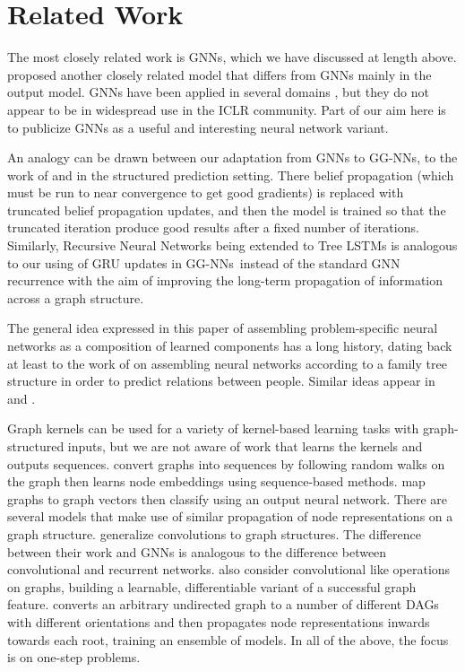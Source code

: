 \documentclass{article} \usepackage{iclr2016_conference,times}
\newcommand{\OurMethodMinorShort}{GG-NN}
\newcommand{\OurMethodMinorShorts}{\OurMethodMinorShort s}
\begin{document}
\section{Related Work}

The most closely related work is GNNs, which we have discussed at
length above.
\cite{micheli2009neural} proposed another
closely related model that differs from GNNs mainly in the output model.
GNNs have been applied in several domains
\citep{gori2005new,di2006comparison,scarselli2009graph,uwents2011neural}, but they
do not appear to be in widespread use in the ICLR community.
Part of our aim here is to publicize GNNs as a useful and interesting
neural network variant. 


An analogy can be drawn between 
our adaptation from GNNs to \OurMethodMinorShorts, to the work of
\cite{domke2011parameter} and \cite{stoyanov2011empirical} in the structured prediction setting.
There belief propagation (which must be run to near convergence to
get good gradients) is replaced with truncated belief propagation updates, and
then the model is trained so that the truncated iteration produce good
results after a fixed number of iterations.
Similarly, Recursive Neural Networks
\citep{goller1996learning,socher2011parsing} being extended to Tree LSTMs
\citep{tai2015improved} is analogous to our using of GRU updates in
\OurMethodMinorShorts~instead of the standard GNN recurrence with the aim of
improving the long-term propagation of information across a graph structure.

The general idea expressed in this paper of assembling
problem-specific neural networks as a composition of learned
components has a long history, dating back at least to the work of
\cite{hinton1988representing} on assembling neural networks according
to a family tree structure in order to predict relations between
people. Similar ideas appear in \cite{hammer2004neural} and \cite{bottou2014machine}.

Graph kernels
\citep{shervashidze2011weisfeiler,kashima2003marginalized} can be used
for a variety of kernel-based learning tasks with graph-structured
inputs, but we are not aware of work that learns the kernels and
outputs sequences.  \cite{perozzi2014deepwalk} convert graphs into sequences by
following random walks on the graph then learns node embeddings using
sequence-based methods.
\cite{sperduti1997supervised} map graphs to graph vectors then
classify using an output neural network.
There are several models that make use of similar propagation of node
representations on a graph structure.
\cite{bruna2013spectral} generalize
convolutions to graph structures.  The difference between their work
and GNNs is analogous to the difference between convolutional and
recurrent networks.
\cite{duvenaud2015convolutional} also consider convolutional like
operations on graphs, building a learnable, differentiable variant of
a successful graph feature.
\cite{lusci2013deep} converts an arbitrary
undirected graph to a number of different DAGs with different
orientations and then propagates node representations inwards towards
each root, training an ensemble of models.
In all of the above, the focus is on one-step problems.
\end{document}
